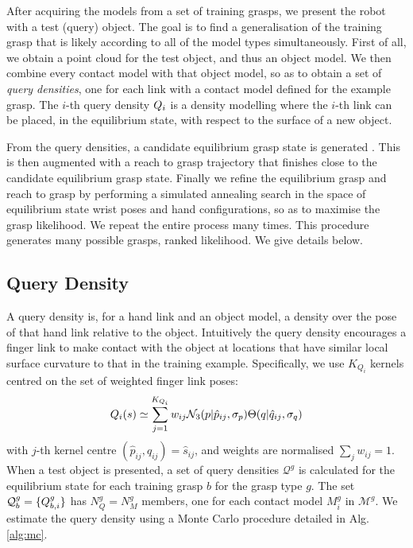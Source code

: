 
After acquiring the models from a set of training grasps, we present the robot with a test (query) object. The goal is to find a generalisation of the training grasp that is likely according to all of the model types simultaneously. First of all, we obtain a point cloud for the test object, and thus an object model. We then combine every contact model with that object model, so as to obtain a set of {\em query densities}, one for each link with a contact model defined for the example grasp. The $i$-th query density $Q_i$ is a density modelling where the $i$-th link can be placed, in the equilibrium state, with respect to the surface of a new object. 

From the query densities, a candidate equilibrium grasp state is generated . This is then augmented with a reach to grasp trajectory that finishes close to the candidate equilibrium grasp state. Finally we refine the equilibrium grasp and reach to grasp by performing a simulated annealing search in the space of equilibrium state wrist poses and hand configurations, so as to maximise the grasp likelihood. We repeat the entire process many times. This procedure generates many possible grasps, ranked likelihood. We give details below.

\subsection{Query Density}

A query density is, for a hand link and an object model, a density over the pose of that hand link relative to the object. Intuitively the query density encourages a finger link to make contact with the object at locations that have similar local surface curvature to that in the training example. Specifically, we use $K_{Q_i}$ kernels centred on the set of weighted finger link poses:
\begin{equation}
\qd_i(s) \simeq \sum^{K_{Q_i}}_{j=1} w_{ij} \mathcal{N}_3(p|{\hat{p}_{ij}}, \sigma_{p}) \Theta(q|{\hat{q}_{ij}}, \sigma_{q})%
\label{eq:qd.approx}
\end{equation}
with $j$-th kernel centre $({\hat{p}_{ij}}, {\hat{q}_{ij}}) = \hat{s}_{ij}$, and weights are normalised $\sum_j w_{ij} = 1$. When a test object is presented, a set of query densities $\mathcal{Q}^g$ is calculated for the equilibrium state for each training grasp $b$ for the grasp type $g$. The set $\mathcal{Q}^g_b =\{Q_{b,i}^g\}$ has $N^g_Q=N^g_M$ members, one for each contact model $M_i^g$ in $\mathcal{M}^g$. We estimate the query density using a Monte Carlo procedure detailed in Alg.\ref{alg:mc}.

